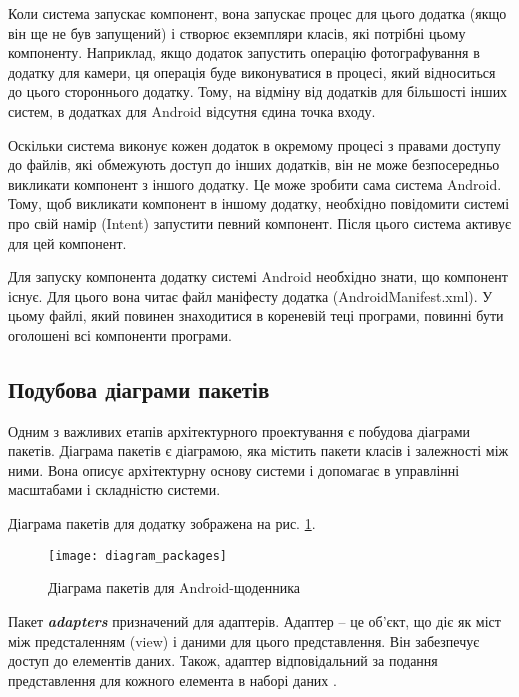 \documentclass[../main.tex]{subfiles}
\begin{document}
Коли система запускає компонент, вона запускає процес для цього додатка (якщо він ще не був запущений) і створює екземпляри класів, які потрібні цьому компоненту. Наприклад, якщо додаток запустить операцію фотографування в додатку для камери, ця операція буде виконуватися в процесі, який відноситься до цього стороннього додатку. Тому, на відміну від додатків для більшості інших систем, в додатках для Android відсутня єдина точка входу.

Оскільки система виконує кожен додаток в окремому процесі з правами доступу до файлів, які обмежують доступ до інших додатків, він не може безпосередньо викликати компонент з іншого додатку. Це може зробити сама система Android. Тому, щоб викликати компонент в іншому додатку, необхідно повідомити системі про свій намір (Intent) запустити певний компонент. Після цього система активує для цей компонент.

Для запуску компонента додатку системі Android необхідно знати, що компонент існує. Для цього вона читає файл маніфесту додатка (AndroidManifest.xml). У цьому файлі, який повинен знаходитися в кореневій теці програми, повинні бути оголошені всі компоненти програми.


\subsection{Подубова діаграми пакетів}
Одним з важливих етапів архітектурного проектування є побудова діаграми пакетів. Діаграма пакетів є діаграмою, яка містить пакети класів і залежності між ними. Вона описує архітектурну основу системи і допомагає в управлінні масштабами і складністю системи. 

Діаграма пакетів для додатку зображена на рис. \ref{diagram:packages}.
\vspace{\baselineskip}

\begin{figure}[H]
	\centering
	\texttt{[image: diagram\_packages]}
	\caption{Діаграма пакетів для Android-щоденника}
	\label{diagram:packages}
\end{figure}

Пакет \textit{\textbf{adapters}} призначений для адаптерів. Адаптер -- це об'єкт, що діє як міст між предсталенням (view) і даними для цього представлення. Він забезпечує доступ до елементів даних. Також, адаптер відповідальний за подання представлення для кожного елемента в наборі даних \cite{adapter}. 
\end{document}
